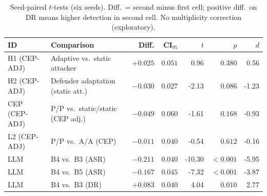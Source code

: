 \begin{table}[!t]
\caption{Seed-paired $t$-tests (six seeds). Diff.\ = second minus first cell; positive diff.\ on DR means higher detection in second cell. No multiplicity correction (exploratory).}
\label{tab:stats-tests}
\centering
\setlength{\tabcolsep}{3pt}
\footnotesize
\begin{tabular}{@{}llrrrrr@{}}
\toprule
\textbf{ID} & \textbf{Comparison} & \textbf{Diff.} & \textbf{CI$_{95}$} & $t$ & $p$ & $d$ \\
\midrule
H1 (CEP-ADJ) & Adaptive vs.\ static attacker & $+0.025$ & $0.051$ & 0.96 & $0.380$ & 0.56 \\
H2 (CEP-ADJ) & Defender adaptation (static att.) & $-0.030$ & $0.027$ & -2.13 & $0.086$ & -1.23 \\
CEP (CEP-ADJ) & P/P vs.\ static/static (CEP adj.) & $-0.049$ & $0.060$ & -1.61 & $0.168$ & -0.93 \\
L2 (CEP-ADJ) & P/P vs.\ A/A (CEP) & $-0.011$ & $0.040$ & -0.54 & $0.612$ & -0.16 \\
LLM & B4 vs.\ B3 (ASR) & $-0.211$ & $0.040$ & -10.30 & $<0.001$ & -5.95 \\
LLM & B4 vs.\ B5 (ASR) & $-0.167$ & $0.045$ & -7.32 & $<0.001$ & -3.87 \\
LLM & B4 vs.\ B3 (DR) & $+0.083$ & $0.040$ & 4.04 & $0.010$ & 2.77 \\
\bottomrule
\end{tabular}
\end{table}
